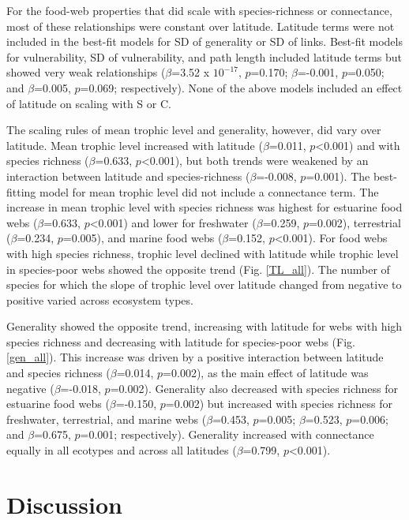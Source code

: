 \documentclass[12pt]{article}
\begin{document}
For the food-web properties that did scale with species-richness or connectance, most of these relationships were 
constant over latitude. Latitude terms were not included in the best-fit models for SD of generality or 
SD of links. Best-fit models for vulnerability, SD of vulnerability, and path length included latitude terms but showed 
very weak relationships ($\beta$=3.52 x $10^{-17}$, $p$=0.170; $\beta$=-0.001, $p$=0.050; and $\beta$=0.005, $p$=0.069; 
respectively). None of the above models included an effect of latitude on scaling with S or C.


The scaling rules of mean trophic level and generality, however, did vary over latitude. 
Mean trophic level increased with latitude ($\beta$=0.011, $p$<0.001) and with species richness 
($\beta$=0.633, $p$<0.001), but both trends were weakened by an interaction between latitude and species-richness 
($\beta$=-0.008, $p$=0.001). The best-fitting model for mean trophic 
level did not include a connectance term. The increase in mean trophic level with species richness was highest for 
estuarine food webs ($\beta$=0.633, $p$<0.001) and lower for freshwater ($\beta$=0.259, $p$=0.002), terrestrial 
($\beta$=0.234, $p$=0.005), and marine food webs ($\beta$=0.152, $p$<0.001). For food webs with high species richness, 
trophic level declined with latitude while trophic level in species-poor webs showed the opposite trend 
(Fig. \ref{TL_all}). The number of species for which the slope of trophic level over latitude changed from negative to 
positive varied across ecosystem types.


Generality showed the opposite trend, increasing with latitude for webs with high species richness and decreasing with
latitude for species-poor webs (Fig. \ref{gen_all}).
This increase was driven by a positive interaction between latitude and species richness ($\beta$=0.014, $p$=0.002), as 
the main effect of latitude was negative ($\beta$=-0.018, $p$=0.002). Generality also decreased with species richness 
for estuarine food webs ($\beta$=-0.150, $p$=0.002) but increased with species richness for freshwater, terrestrial, 
and marine webs ($\beta$=0.453, $p$=0.005; $\beta$=0.523, $p$=0.006; and $\beta$=0.675, $p$=0.001; respectively). 
Generality increased with connectance equally in all ecotypes and across all latitudes ($\beta$=0.799, $p$<0.001).


\section*{Discussion}
\end{document}
